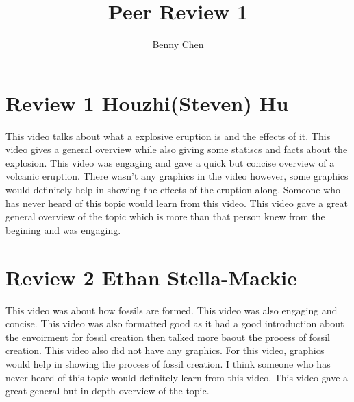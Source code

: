 \documentclass{article}
\title{Peer Review 1}
\author{Benny Chen}
\date{}
\begin{document}
\maketitle

\section*{Review 1 Houzhi(Steven) Hu}

This video talks about what a explosive eruption is and the effects of it. This video gives a general overview while also giving some statiscs and facts about the explosion. This video was engaging and gave a quick but concise overview of a volcanic eruption. There wasn't any graphics in the video however, some graphics would definitely help in showing the effects of the eruption along. Someone who has never heard of this topic would learn from this video. This video gave a great general overview of the topic which is more than that person knew from the begining and was engaging.

\section*{Review 2 Ethan Stella-Mackie}

This video was about how fossils are formed. This video was also engaging and concise. This video was also formatted good as it had a good introduction about the envoirment for fossil creation then talked more baout the process of fossil creation. This video also did not have any graphics. For this video, graphics would help in showing the process of fossil creation. I think someone who has never heard of this topic would definitely learn from this video. This video gave a great general but in depth overview of the topic.
\end{document}
